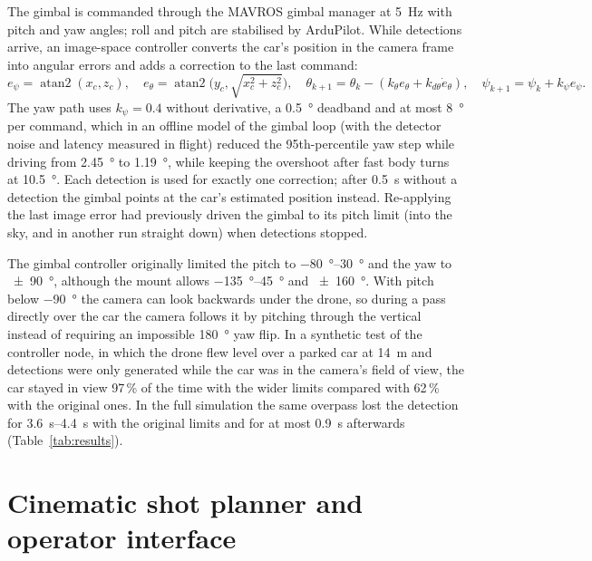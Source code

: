 \documentclass[11pt,a4paper]{report}
\begin{document}
The gimbal is commanded through the MAVROS gimbal manager at \SI{5}{Hz} with
pitch and yaw angles; roll and pitch are stabilised by ArduPilot. While
detections arrive, an image-space controller converts the car's position in the
camera frame into angular errors and adds a correction to the last command:
\begin{equation}
  e_\psi = \operatorname{atan2}(x_c, z_c),\quad
  e_\theta = \operatorname{atan2}\!\bigl(y_c, \sqrt{x_c^2+z_c^2}\bigr),\quad
  \theta_{k+1} = \theta_k - (k_\theta e_\theta + k_{d\theta}\dot e_\theta),\quad
  \psi_{k+1} = \psi_k + k_\psi e_\psi .
\end{equation}
The yaw path uses $k_\psi=0.4$ without derivative, a \SI{0.5}{\degree} deadband and
at most \SI{8}{\degree} per command, which in an offline model of the gimbal loop (with the
detector noise and latency measured in flight) reduced the 95th-percentile yaw
step while driving from \SI{2.45}{\degree} to \SI{1.19}{\degree}, while keeping the
overshoot after fast body turns at \SI{10.5}{\degree}. Each detection is used
for exactly one correction; after \SI{0.5}{s} without a detection the gimbal
points at the car's estimated position instead. Re-applying the last image error
had previously driven the gimbal to its pitch limit (into the sky, and in another
run straight down) when detections stopped.

The gimbal controller originally limited the pitch to \SIrange{-80}{30}{\degree}
and the yaw to \SI{\pm 90}{\degree}, although the mount allows
\SIrange{-135}{45}{\degree} and \SI{\pm 160}{\degree}. With pitch below
\SI{-90}{\degree} the camera can look backwards under the drone, so during a pass
directly over the car the camera follows it by pitching through the vertical
instead of requiring an impossible \SI{180}{\degree} yaw flip. In a synthetic test of
the controller node, in which the drone flew level over a parked car at
\SI{14}{m} and detections were only generated while the car was in the camera's
field of view, the car stayed in view 97\,\% of the time with the wider limits
compared with 62\,\% with the original ones. In the full simulation the same
overpass lost the detection for \SIrange{3.6}{4.4}{s} with the original limits
and for at most \SI{0.9}{s} afterwards (Table~\ref{tab:results}).

\section{Cinematic shot planner and operator interface}
\label{sec:planner}
\end{document}
